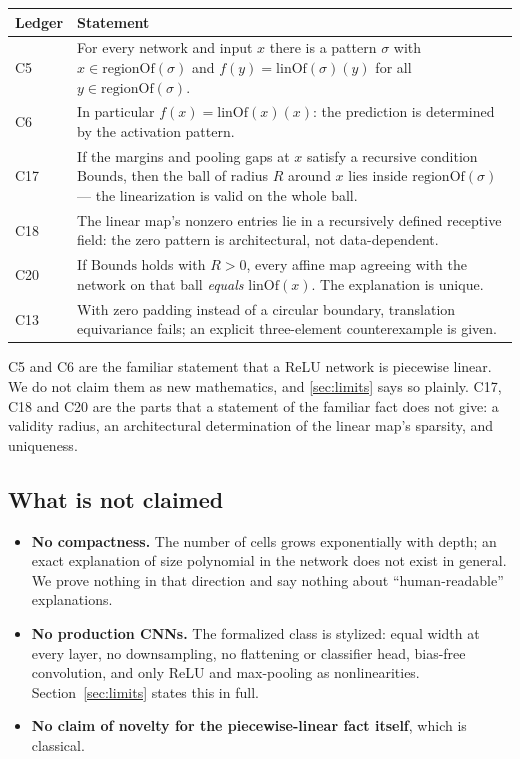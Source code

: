 \documentclass[11pt]{article}
\newcommand{\LinOf}{\mathrm{linOf}}
\newcommand{\RegOf}{\mathrm{regionOf}}
\begin{document}
\begin{center}
\begin{tabular}{@{}p{}p{}@{}}
\toprule
Ledger & Statement \\
\midrule
C5 & For every network and input $x$ there is a pattern $\sigma$ with
  $x \in \RegOf(\sigma)$ and $f(y) = \LinOf(\sigma)(y)$ for all $y \in \RegOf(\sigma)$. \\
C6 & In particular $f(x) = \LinOf(x)(x)$: the prediction is determined by the
  activation pattern. \\
C17 & If the margins and pooling gaps at $x$ satisfy a recursive condition
  $\mathrm{Bounds}$, then the ball of radius $R$ around $x$ lies inside
  $\RegOf(\sigma)$ --- the linearization is valid on the whole ball. \\
C18 & The linear map's nonzero entries lie in a recursively defined receptive
  field: the zero pattern is architectural, not data-dependent. \\
C20 & If $\mathrm{Bounds}$ holds with $R>0$, every affine map agreeing with
  the network on that ball \emph{equals} $\LinOf(x)$. The explanation is unique. \\
C13 & With zero padding instead of a circular boundary, translation
  equivariance fails; an explicit three-element counterexample is given. \\
\bottomrule
\end{tabular}
\end{center}

C5 and C6 are the familiar statement that a ReLU network is piecewise linear.
We do not claim them as new mathematics, and
\cref{sec:limits} says so plainly. C17, C18 and C20 are the parts that a
statement of the familiar fact does not give: a validity radius, an
architectural determination of the linear map's sparsity, and uniqueness.

\subsection{What is not claimed}

\begin{itemize}
\item \textbf{No compactness.} The number of cells grows exponentially with
  depth; an exact explanation of size polynomial in the network does not exist
  in general. We prove nothing in that direction and say nothing about
  ``human-readable'' explanations.
\item \textbf{No production CNNs.} The formalized class is stylized: equal
  width at every layer, no downsampling, no flattening or classifier head,
  bias-free convolution, and only ReLU and max-pooling as nonlinearities.
  Section~\ref{sec:limits} states this in full.
\item \textbf{No claim of novelty for the piecewise-linear fact itself}, which
  is classical.
\end{itemize}
\end{document}
